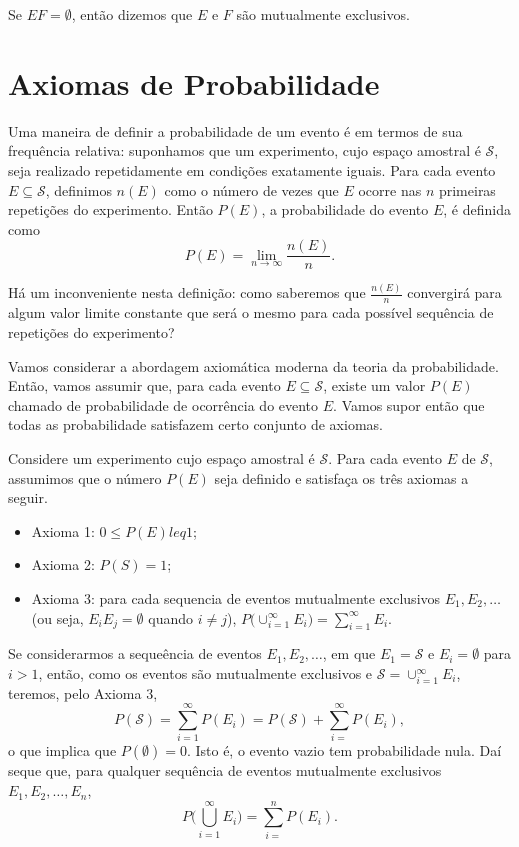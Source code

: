 \documentclass[]{book}
\providecommand{\tightlist}{%
  \setlength{\itemsep}{0pt}\setlength{\parskip}{0pt}}
\theoremstyle{definition}
\theoremstyle{definition}
\theoremstyle{definition}
\theoremstyle{remark}
\begin{document}
Se \(EF=\emptyset\), então dizemos que \(E\) e \(F\) são mutualmente exclusivos.

\hypertarget{axiomas-de-probabilidade}{%
\section{Axiomas de Probabilidade}\label{axiomas-de-probabilidade}}

Uma maneira de definir a probabilidade de um evento é em termos de sua frequência relativa: suponhamos que um experimento, cujo espaço amostral é \(\mathcal{S}\), seja realizado repetidamente em condições exatamente iguais.
Para cada evento \(E \subseteq \mathcal{S}\), definimos \(n(E)\) como o número de vezes que \(E\) ocorre nas \(n\) primeiras repetições do experimento.
Então \(P(E)\), a probabilidade do evento \(E\), é definida como
\[P(E) = \lim_{n \rightarrow \infty} \frac{n(E)}{n}.\]

Há um inconveniente nesta definição: como saberemos que \(\frac{n(E)}{n}\) convergirá para algum valor limite constante que será o mesmo para cada possível sequência de repetições do experimento?

Vamos considerar a abordagem axiomática moderna da teoria da probabilidade.
Então, vamos assumir que, para cada evento \(E \subseteq \mathcal{S}\), existe um valor \(P(E)\) chamado de probabilidade de ocorrência do evento \(E\).
Vamos supor então que todas as probabilidade satisfazem certo conjunto de axiomas.

Considere um experimento cujo espaço amostral é \(\mathcal{S}\).
Para cada evento \(E\) de \(\mathcal{S}\), assumimos que o número \(P(E)\) seja definido e satisfaça os três axiomas a seguir.

\begin{itemize}
\tightlist
\item
  Axioma 1: \(0 \leq P(E) leq 1\);
\item
  Axioma 2: \(P(S) = 1\);
\item
  Axioma 3: para cada sequencia de eventos mutualmente exclusivos \(E_1, E_2, \ldots\) (ou seja, \(E_i E_j=\emptyset\) quando \(i\neq j\)), \(P\big(\cup_{i=1}^{\infty}E_i\big)=\sum_{i=1}^{\infty}E_i\).
\end{itemize}

Se considerarmos a sequeência de eventos \(E_1, E_2, \ldots\), em que \(E_1=\mathcal{S}\) e \(E_i=\emptyset\) para \(i>1\), então, como os eventos são mutualmente exclusivos e \(\mathcal{S}=\cup_{i=1}^{\infty}E_i\), teremos, pelo Axioma 3,
\[P(\mathcal{S})=\sum_{i=1}^{\infty}P(E_i) = P(\mathcal{S}) + \sum_{i=}^{\infty}P(E_i),\]
o que implica que \(P(\emptyset)=0\).
Isto é, o evento vazio tem probabilidade nula.
Daí seque que, para qualquer sequência de eventos mutualmente exclusivos \(E_1, E_2, \ldots, E_n\),
\[P\Bigg(\bigcup_{i=1}^{\infty}E_i\Bigg) = \sum_{i=}^{n}P(E_i).\]
\end{document}
